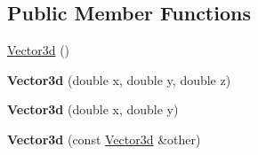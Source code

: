 \subsection*{Public Member Functions}
\begin{DoxyCompactItemize}
\item 
\hyperlink{classCartWheel_1_1Math_1_1Vector3d_aac098d8695c4288e4844835e62945244}{Vector3d} ()
\item 
\hypertarget{classCartWheel_1_1Math_1_1Vector3d_a2af71ff755b2d4aa4e73eb0a30dc103a}{
{\bfseries Vector3d} (double x, double y, double z)}
\label{classCartWheel_1_1Math_1_1Vector3d_a2af71ff755b2d4aa4e73eb0a30dc103a}

\item 
\hypertarget{classCartWheel_1_1Math_1_1Vector3d_a691bab3536261cf98592f43ff3509569}{
{\bfseries Vector3d} (double x, double y)}
\label{classCartWheel_1_1Math_1_1Vector3d_a691bab3536261cf98592f43ff3509569}

\item 
\hypertarget{classCartWheel_1_1Math_1_1Vector3d_a42dbcfa9173497797dd66ff0a0bf866c}{
{\bfseries Vector3d} (const \hyperlink{classCartWheel_1_1Math_1_1Vector3d}{Vector3d} \&other)}
\label{classCartWheel_1_1Math_1_1Vector3d_a42dbcfa9173497797dd66ff0a0bf866c}


\end{DoxyCompactItemize}
